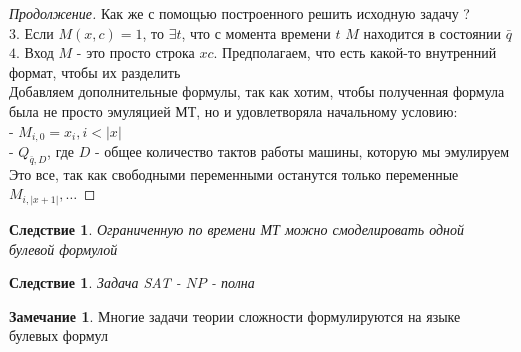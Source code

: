 \documentclass{beamer}
\theoremstyle{plain}
\newtheorem{cor}[thm]{Следствие}
\theoremstyle{definition}
\newtheorem{rmk}[thm]{Замечание}
\begin{document}
\begin{frame}
	\begin{proof}[Продолжение]
	    Как же с помощью построенного решить исходную задачу ? \\
	    $3.$ Если $M(x,c)=1$, то $\exists t$, что с момента времени $t$ $M$ находится в состоянии $\bar{q}$ \\
	    $4.$ Вход $M$ - это просто строка $xc$. Предполагаем, что есть какой-то внутренний формат, чтобы их разделить \\
	    Добавляем дополнительные формулы, так как хотим, чтобы полученная формула была не просто эмуляцией МТ, но и удовлетворяла начальному условию: \\
	    - $M_{i,0}=x_i, i<|x|$ \\
	    - $Q_{\bar{q}, D}$, где $D$ - общее количество тактов работы машины, которую мы эмулируем \\
	    Это все, так как свободными переменными останутся только переменные $M_{i,|x+1|}, \dots$
	\end{proof}
\end{frame}

\begin{frame}
	\begin{cor}
	    Ограниченную по времени МТ можно смоделировать одной булевой формулой 	
	\end{cor}
	\begin{cor}
	    Задача SAT - $NP$ - полна  	
	\end{cor}
\end{frame}

\begin{frame}
	\begin{rmk}
	    Многие задачи теории сложности формулируются на языке булевых формул	
	\end{rmk}

\end{frame}
\end{document}
